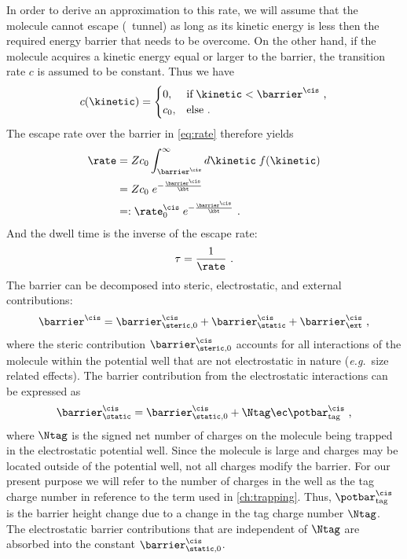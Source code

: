 In order to derive an approximation to this rate, we will assume that the molecule cannot escape (\ie~tunnel)
as long as its kinetic energy is less then the required energy barrier that needs to be overcome. On the other
hand, if the molecule acquires a kinetic energy equal or larger to the barrier, the transition rate $c$ is
assumed to be constant. Thus we have
%
\begin{align*}
    c(\kinetic) =
        \begin{cases}
            0, & \text{if}\; \kinetic < \barrier^\cis \text{ ,}\\
            c_0, & \text{else} \text{ .}
        \end{cases}
\end{align*}
%
The escape rate over the barrier in \cref{eq:rate} therefore yields
%
\begin{align*}
    \rate ={}& Z c_0 \int_{\barrier^\cis}^\infty d\kinetic\;f(\kinetic)\\
    ={}& Z c_0\; e^{-\frac{\barrier^\cis}{\kbt}}\\
    =:& \;\rate^{\cis}_0\; e^{-\frac{\barrier^\cis}{\kbt}}
    \text{ .}
\end{align*}
%
And the dwell time is the inverse of the escape rate:
%
\begin{align*}
    \tau = \frac{1}{\rate}
    \text{ .}
\end{align*}
%
The barrier can be decomposed into steric, electrostatic, and external
contributions:
%
\begin{align}\label{eq:barrier}
    \barrier^\cis = \barrier^{\cis}_{\steric,0} + \barrier^\cis_\static +
    \barrier^\cis_\ext
    \text{ ,}
\end{align}
%
where the steric contribution $\barrier^{\cis}_{\steric,0}$ accounts for all interactions of the molecule
within the potential well that are not electrostatic in nature (\textit{e.g.}~size related effects). The
barrier contribution from the electrostatic interactions can be expressed as
%
\begin{align}\label{eq:barrier_static}
    \barrier^\cis_{\static} =
    \barrier^{\cis}_{\static,0} + \Ntag \ec \potbar_{\rm{tag}}^\cis
    \text{ ,}
\end{align}
%
where $\Ntag$ is the signed net number of charges on the molecule being trapped in the electrostatic potential
well. Since the molecule is large and charges may be located outside of the potential well, not all charges
modify the barrier. For our present purpose we will refer to the number of charges in the well as the tag
charge number in reference to the term used in \cref{ch:trapping}. Thus, $\potbar_{\rm tag}^\cis$ is the
barrier height change due to a change in the tag charge number $\Ntag$. The electrostatic barrier
contributions that are independent of $\Ntag$ are absorbed into the constant $\barrier^{\cis}_{\static,0}$.

